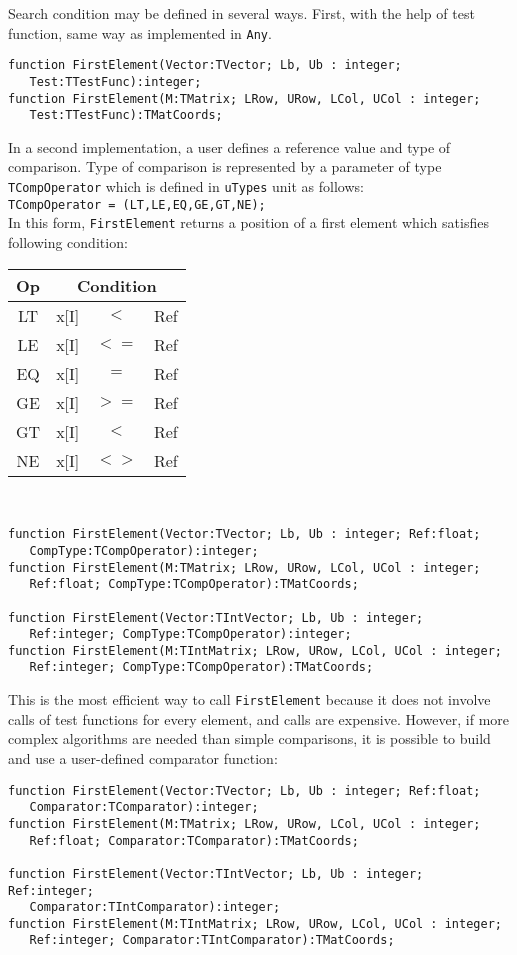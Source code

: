 \documentclass[12pt,a4paper,oneside]{article}
\newcommand{\code}[1]{\texttt{#1}}
\begin{document}
Search condition may be defined in several ways. First, with the help of test function, same way as implemented in \code{Any}. 
\begin{verbatim}
function FirstElement(Vector:TVector; Lb, Ub : integer; 
   Test:TTestFunc):integer;
function FirstElement(M:TMatrix; LRow, URow, LCol, UCol : integer;
   Test:TTestFunc):TMatCoords;
\end{verbatim}
In a second implementation, a user defines a reference value and type of comparison. Type of comparison is represented by a parameter of type \code{TCompOperator} which is defined in \code{uTypes} unit as follows:\\
\code{TCompOperator = (LT,LE,EQ,GE,GT,NE);}\\
In this form, \code{FirstElement} returns a position of a first element which satisfies following condition:
\vskip 6pt
\begin{tabular}{c|rcl|}
	Op & \multicolumn{3}{|c|}{Condition}\\
	\hline
	LT & x[I]&$<$&Ref\\ 
	LE & x[I]&$<=$&Ref\\ 
	EQ & x[I]&$=$&Ref\\ 
	GE & x[I]&$>=$&Ref\\ 
	GT & x[I]&$<$&Ref\\ 
	NE & x[I]&$<>$&Ref \\ 
\end{tabular}\\ 
\vskip 6pt
\begin{verbatim}
function FirstElement(Vector:TVector; Lb, Ub : integer; Ref:float;
   CompType:TCompOperator):integer;
function FirstElement(M:TMatrix; LRow, URow, LCol, UCol : integer;
   Ref:float; CompType:TCompOperator):TMatCoords; 

function FirstElement(Vector:TIntVector; Lb, Ub : integer; 
   Ref:integer; CompType:TCompOperator):integer;
function FirstElement(M:TIntMatrix; LRow, URow, LCol, UCol : integer;
   Ref:integer; CompType:TCompOperator):TMatCoords;
\end{verbatim}

This is the most efficient way to call \code{FirstElement} because it does not involve calls of test functions for every element, and calls are expensive. However, if more complex algorithms are needed than simple comparisons, it is possible to build and use a user-defined comparator function:
\begin{verbatim}
function FirstElement(Vector:TVector; Lb, Ub : integer; Ref:float;
   Comparator:TComparator):integer;
function FirstElement(M:TMatrix; LRow, URow, LCol, UCol : integer;
   Ref:float; Comparator:TComparator):TMatCoords;

function FirstElement(Vector:TIntVector; Lb, Ub : integer; Ref:integer;
   Comparator:TIntComparator):integer;
function FirstElement(M:TIntMatrix; LRow, URow, LCol, UCol : integer;
   Ref:integer; Comparator:TIntComparator):TMatCoords; 
\end{verbatim}
\end{document}
